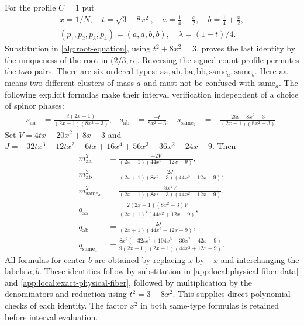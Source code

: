 For the profile $C=1$ put
\begin{equation}\label{app:local:two-pair-parameter}
\begin{gathered}
 x=1/N,\quad t=\sqrt{3-8x^2},\quad
 a=\tfrac14-\tfrac x2,\quad b=\tfrac14+\tfrac x2,\\
 (p_1,p_2,p_3,p_4)=(a,a,b,b),\quad \lambda=(1+t)/4.
\end{gathered}
\end{equation}
Substitution in \eqref{alg:root-equation}, using $t^2+8x^2=3$,
proves the last identity by the uniqueness of the root in $(2/3,\alpha]$.
Reversing the signed count profile permutes the two pairs.
There are six ordered types: $\mathrm{aa},\mathrm{ab},\mathrm{ba},
\mathrm{bb},\mathrm{same}_a,\mathrm{same}_b$.
Here $\mathrm{aa}$ means two different clusters of mass $a$ and must
not be confused with $\mathrm{same}_a$.
The following explicit formulas make their interval verification
independent of a choice of spinor phases:
\begin{align}
 s_{\mathrm{aa}}&=\frac{t(2x+1)}{(2x-1)(8x^2-3)},&
 s_{\mathrm{ab}}&=\frac{-t}{8x^2-3},&
 s_{\mathrm{same}_a}&=
       -\frac{2tx+8x^2-3}{(2x-1)(8x^2-3)}. \label{app:local:sharp-s}
\end{align}
Set $V=4tx+20x^2+8x-3$ and
$J=-32tx^3-12tx^2+6tx+16x^4+56x^3-36x^2-24x+9$.
Then
\begin{align}
 m_{\mathrm{aa}}^2&=
 \frac{-2V}{(2x-1)(44x^2+12x-9)},\nonumber\\
 m_{\mathrm{ab}}^2&=
 \frac{2J}{(2x+1)(8x^2-3)(44x^2+12x-9)},\nonumber\\
 m_{\mathrm{same}_a}^2&=
 \frac{8x^2V}{(2x-1)(8x^2-3)(44x^2+12x-9)}, \label{app:local:sharp-m}\\
 q_{\mathrm{aa}}&=
 \frac{2(2x-1)(8x^2-3)V}{(2x+1)^2(44x^2+12x-9)},\nonumber\\
 q_{\mathrm{ab}}&=
 \frac{-2J}{(2x+1)(44x^2+12x-9)},\nonumber\\
 q_{\mathrm{same}_a}&=
 \frac{8x^2(-32tx^2+104x^3-36x^2-42x+9)}
 {9(2x-1)(2x+1)(44x^2+12x-9)}. \label{app:local:sharp-q}
\end{align}
All formulas for center $b$ are obtained by replacing $x$ by $-x$
and interchanging the labels $a,b$. These identities follow by
substitution in \eqref{app:local:physical-fiber-data} and
\eqref{app:local:exact-physical-fiber}, followed by multiplication by
the denominators and reduction using $t^2=3-8x^2$.
This supplies direct polynomial checks of each identity. The factor
$x^2$ in both same-type formulas is retained before interval evaluation.

